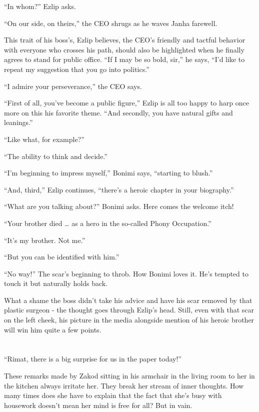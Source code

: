 \documentclass[twoside,11pt]{book}
\begin{document}
``In whom?'' Ezlip asks.

``On our side, on theirs,'' the CEO shrugs as he waves Janha farewell.

This trait of his boss's, Ezlip believes, the CEO's friendly and tactful
behavior with everyone who crosses his path, should also be highlighted when he finally agrees to stand for public
office. ``If I may be so bold, sir,'' he says, ``I'd like to repeat my suggestion that you go into
politics.''

``I admire your perseverance,'' the CEO says.

``First of all, you've become a public figure,'' Ezlip is all too happy to harp once more on
this his favorite theme. ``And secondly, you have natural gifts and leanings.''

``Like what, for example?''

``The ability to think and decide.''

``I'm beginning to impress myself,'' Bonimi says, ``starting to
blush.''

``And, third,'' Ezlip continues, ``there's a heroic chapter in your biography.''

``What are you talking about?'' Bonimi asks. Here comes the welcome itch!

``Your brother died {\dots} as a hero in the so-called Phony Occupation.''

``It's my brother. Not me.''

``But you can be identified with him.''

``No way!'' The scar's beginning to throb. How Bonimi loves it. He's tempted to touch it but
naturally holds back.

What a shame the boss didn't take his advice and have his scar removed by that plastic surgeon - the thought goes
through Ezlip's head. Still, even with that scar on the left cheek, his picture in the media alongside mention of his
heroic brother will win him quite a few points.



\chapter{}

``Rimat, there is a big surprise for us in the paper today!''

These remarks made by Zakod sitting in his armchair in the living room to her in the kitchen always irritate her. They
break her stream of inner thoughts. How many times does she have to
explain that the fact that she's busy with housework doesn't mean her mind is
free for all? But in vain.
\end{document}
